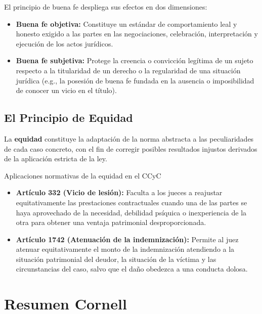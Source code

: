 \documentclass[12pt,oneside]{book}
\begin{document}
El principio de buena fe despliega sus efectos en dos dimensiones:

\begin{itemize}
    \item \textbf{Buena fe objetiva:} Constituye un estándar de comportamiento leal y honesto exigido a las partes en las negociaciones, celebración, interpretación y ejecución de los actos jurídicos.
    \item \textbf{Buena fe subjetiva:} Protege la creencia o convicción legítima de un sujeto respecto a la titularidad de un derecho o la regularidad de una situación jurídica (e.g., la posesión de buena fe fundada en la ausencia o imposibilidad de conocer un vicio en el título).
\end{itemize}

\section{El Principio de Equidad}

La \textbf{equidad} constituye la adaptación de la norma abstracta a las peculiaridades de cada caso concreto, con el fin de corregir posibles resultados injustos derivados de la aplicación estricta de la ley.

\begin{example}{Aplicaciones normativas de la equidad en el CCyC}
\begin{itemize}
    \item \textbf{Artículo 332 (Vicio de lesión):} Faculta a los jueces a reajustar equitativamente las prestaciones contractuales cuando una de las partes se haya aprovechado de la necesidad, debilidad psíquica o inexperiencia de la otra para obtener una ventaja patrimonial desproporcionada.
    \item \textbf{Artículo 1742 (Atenuación de la indemnización):} Permite al juez atenuar equitativamente el monto de la indemnización atendiendo a la situación patrimonial del deudor, la situación de la víctima y las circunstancias del caso, salvo que el daño obedezca a una conducta dolosa.
\end{itemize}
\end{example}


\appendix

\chapter{Resumen Cornell}
\end{document}
